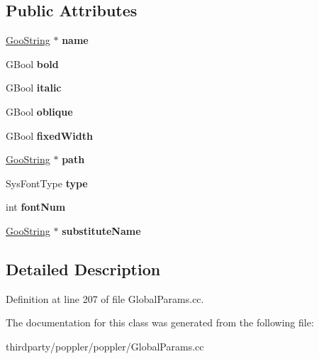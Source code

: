 \subsection*{Public Attributes}
\begin{DoxyCompactItemize}
\item 
\mbox{\label{class_sys_font_info_a9820e49e973facc1809d6553924a1aad}} 
\hyperlink{class_goo_string}{Goo\+String} $\ast$ {\bfseries name}
\item 
\mbox{\label{class_sys_font_info_a52cb5b907bd941f92d7668264deb77f2}} 
G\+Bool {\bfseries bold}
\item 
\mbox{\label{class_sys_font_info_a862c13fd373701ee0a6be6abd8783acb}} 
G\+Bool {\bfseries italic}
\item 
\mbox{\label{class_sys_font_info_af76b74fd351813598cb90720d8c2d136}} 
G\+Bool {\bfseries oblique}
\item 
\mbox{\label{class_sys_font_info_a6e1ca9af21ca132488ddc3df19e0271a}} 
G\+Bool {\bfseries fixed\+Width}
\item 
\mbox{\label{class_sys_font_info_a1cdb2dd2cb24f66dc4f4e802ef44d792}} 
\hyperlink{class_goo_string}{Goo\+String} $\ast$ {\bfseries path}
\item 
\mbox{\label{class_sys_font_info_ae8611f5fbcfb9846f06a57fe7f649315}} 
Sys\+Font\+Type {\bfseries type}
\item 
\mbox{\label{class_sys_font_info_aab12fd18654d71ba8a8d8bf25b626dd4}} 
int {\bfseries font\+Num}
\item 
\mbox{\label{class_sys_font_info_a6714cc01728f54ac88bc135fd7253e09}} 
\hyperlink{class_goo_string}{Goo\+String} $\ast$ {\bfseries substitute\+Name}
\end{DoxyCompactItemize}


\subsection{Detailed Description}


Definition at line 207 of file Global\+Params.\+cc.



The documentation for this class was generated from the following file\+:\begin{DoxyCompactItemize}
\item 
thirdparty/poppler/poppler/Global\+Params.\+cc\end{DoxyCompactItemize}
